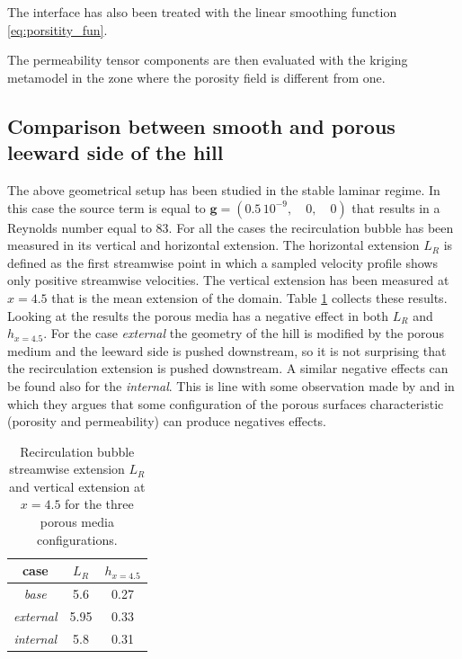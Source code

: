 The interface has also been treated with the linear smoothing function \eqref{eq:porsitity_fun}.

The permeability tensor components are then evaluated with the kriging metamodel in the zone where the porosity field is different from one.


\subsection{Comparison between smooth and porous leeward side of the hill}

The above geometrical setup has been studied in the stable laminar regime. In this case the source term is equal to $\mathbf{g} = (0.5 \,10^{-9}, \quad0, \quad0)$ that results in a Reynolds number equal to $83$.
For all the cases the recirculation bubble has been measured in its vertical and horizontal extension. The horizontal extension $L_R$ is defined as the first streamwise point in which a sampled velocity profile shows only positive streamwise velocities. The vertical extension has been measured at $x=4.5$ that is the mean extension of the domain.
Table \ref{tb:bubble} collects these results. Looking at the results the porous media has a negative effect in both $L_R$ and $h_{x=4.5}$. For the case \textit{external} the geometry of the hill is modified by the porous medium and the leeward side is pushed downstream, so it is not surprising that the recirculation extension is pushed downstream. A similar negative effects can be found also for the \textit{internal}. This is line with some observation made by \citet{jimenez2001turbulent} and \citet{segura2017permeable} in which they argues that some configuration of the porous surfaces characteristic (porosity and permeability) can produce negatives effects.

\begin{table}[h]
	\centering
	\begin{tabular}{c|c|c}
		case & $L_R$ & $h_{x=4.5}$ \\ 
		\hline 
		\hline 
		\textit{base} & 5.6 & 0.27 \\ 
		\hline 
		\textit{external} & 5.95 & 0.33 \\ 
		\hline 
		\textit{internal} & 5.8 & 0.31 \\ 
		\hline 
		\hline 
	\end{tabular}
	\caption{Recirculation bubble streamwise extension $L_R$ and vertical extension at $x=4.5$ for the three porous media configurations.}
	\label{tb:bubble}
\end{table}

